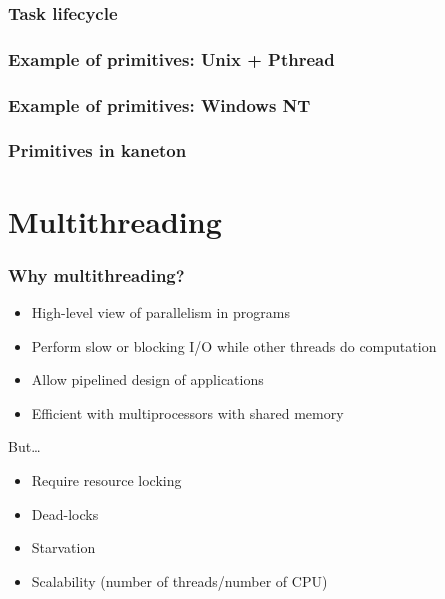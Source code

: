 
\begin{frame}
  \frametitle{Task lifecycle}
\end{frame}


\begin{frame}
  \frametitle{Example of primitives: Unix + Pthread}

  \begin{center}
  \end{center}

\end{frame}


\begin{frame}
  \frametitle{Example of primitives: Windows NT}

  \begin{center}
  \end{center}

\end{frame}


\begin{frame}
  \frametitle{Primitives in kaneton}

  \begin{center}
  \end{center}

\end{frame}

%
%

\section{Multithreading}


\begin{frame}
  \frametitle{Why multithreading?}

  \begin{itemize}
  \item
    High-level view of parallelism in programs
  \item
    Perform slow or blocking I/O while other threads do computation
  \item
    Allow pipelined design of applications
  \item
    Efficient with multiprocessors with shared memory
  \end{itemize}

  But\ldots

  \begin{itemize}
  \item
    Require resource locking
  \item
    Dead-locks
  \item
    Starvation
  \item
    Scalability (number of threads/number of CPU)
  \end{itemize}

\end{frame}

